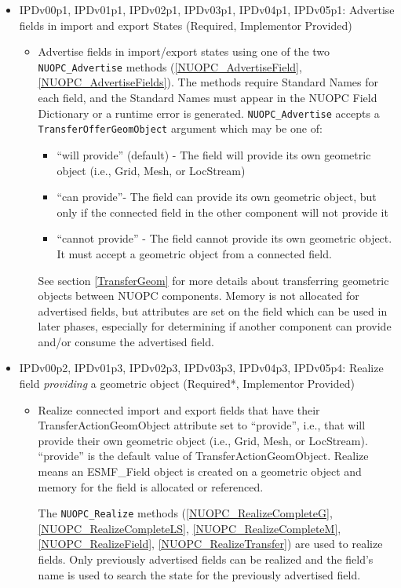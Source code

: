 \begin{itemize}
\begin{itemize}
\begin{itemize}
    \end{itemize}  
  \end{itemize}  
\item IPDv00p1, IPDv01p1, IPDv02p1, IPDv03p1, IPDv04p1, IPDv05p1: Advertise fields in import and export States ({\sc Required, Implementor Provided})
  \begin{itemize}
  \item Advertise fields in import/export states using one of the two {\tt NUOPC\_Advertise} methods (\ref{NUOPC_AdvertiseField}, \ref{NUOPC_AdvertiseFields}). The methods require Standard Names for each field, and the Standard Names must appear in the NUOPC Field Dictionary or a runtime error is generated.  {\tt NUOPC\_Advertise} accepts a {\tt TransferOfferGeomObject} argument which may be one of:
    \begin{itemize}
    \item ``will provide'' (default) - The field will provide its own geometric object (i.e., Grid, Mesh, or LocStream)
    \item ``can provide''- The field can provide its own geometric object, but only if the connected field in the other component will not provide it
    \item ``cannot provide'' - The field cannot provide its own geometric object. It must accept a geometric object from a connected field.
    \end{itemize}
  See section \ref{TransferGeom} for more details about transferring geometric objects between NUOPC components.
  Memory is not allocated for advertised fields, but attributes are set on the field which can be used in later phases, especially for determining if another component can provide and/or consume the advertised field.
  \end{itemize}
\item IPDv00p2, IPDv01p3, IPDv02p3, IPDv03p3, IPDv04p3, IPDv05p4: Realize field {\em providing} a geometric object ({\sc Required*, Implementor Provided})
  \begin{itemize}
  \item Realize connected import and export fields that have their TransferActionGeomObject attribute set to ``provide'', i.e., that will provide their own geometric object (i.e., Grid, Mesh, or LocStream). ``provide'' is the default value of TransferActionGeomObject. Realize means an ESMF\_Field object is created on a geometric object and memory for the field is allocated or referenced.

The {\tt NUOPC\_Realize} methods (\ref{NUOPC_RealizeCompleteG}, \ref{NUOPC_RealizeCompleteLS}, \ref{NUOPC_RealizeCompleteM}, \ref{NUOPC_RealizeField}, \ref{NUOPC_RealizeTransfer}) are used to realize fields. Only previously advertised fields can be realized and the field's name is used to search the state for the previously advertised field.


\end{itemize}
\end{itemize}
